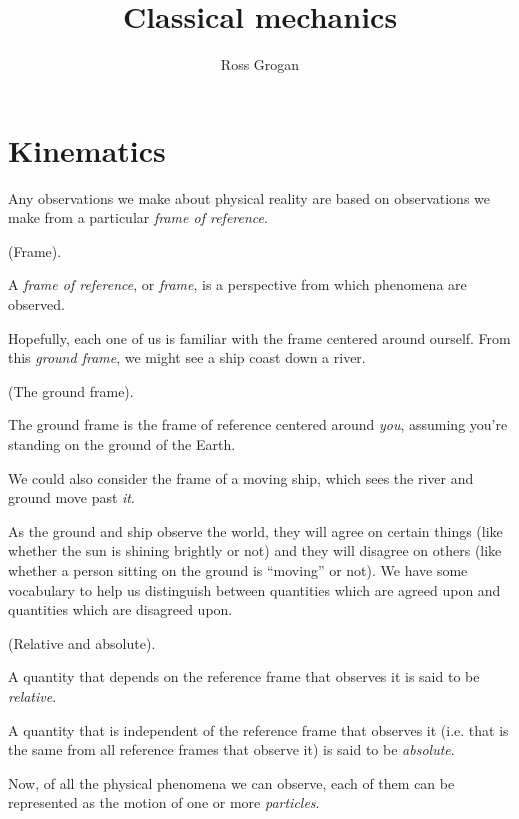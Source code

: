 \documentclass{article}
\title{Classical mechanics}
\author{Ross Grogan}
\date{}
\begin{document}
\maketitle

\section*{Kinematics}

Any observations we make about physical reality are based on observations we make from a particular \textit{frame of reference}.

\begin{defn}
	(Frame).
	
	A \textit{frame of reference}, or \textit{frame}, is a perspective from which phenomena are observed. 
\end{defn}

Hopefully, each one of us is familiar with the frame centered around ourself. From this \textit{ground frame}, we might see a ship coast down a river.

\begin{defn}
	(The ground frame).
	
	The ground frame is the frame of reference centered around \textit{you}, assuming you're standing on the ground of the Earth.
\end{defn}

We could also consider the frame of a moving ship, which sees the river and ground move past \textit{it}.

As the ground and ship observe the world, they will agree on certain things (like whether the sun is shining brightly or not) and they will disagree on others (like whether a person sitting on the ground is ``moving'' or not). We have some vocabulary to help us distinguish between quantities which are agreed upon and quantities which are disagreed upon.

\begin{defn}
	(Relative and absolute).
	
	A quantity that depends on the reference frame that observes it is said to be \textit{relative}.
	
	A quantity that is independent of the reference frame that observes it (i.e. that is the same from all reference frames that observe it) is said to be \textit{absolute}.
\end{defn}

Now, of all the physical phenomena we can observe, each of them can be represented as the motion of one or more \textit{particles}.
\end{document}

